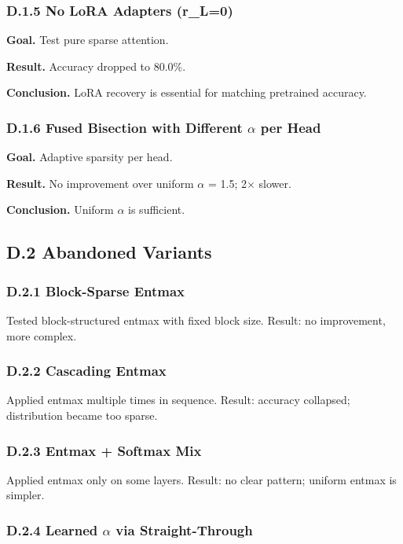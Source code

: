 \subsubsection{D.1.5 No LoRA Adapters (r\_L=0)}

\textbf{Goal.} Test pure sparse attention.

\textbf{Result.} Accuracy dropped to 80.0\%.

\textbf{Conclusion.} LoRA recovery is essential for matching pretrained accuracy.

\subsubsection{D.1.6 Fused Bisection with Different $\alpha$ per Head}

\textbf{Goal.} Adaptive sparsity per head.

\textbf{Result.} No improvement over uniform $\alpha$ = 1.5; 2$\times$ slower.

\textbf{Conclusion.} Uniform $\alpha$ is sufficient.

\subsection{D.2 Abandoned Variants}

\subsubsection{D.2.1 Block-Sparse Entmax}

Tested block-structured entmax with fixed block size. Result: no improvement, 
more complex.

\subsubsection{D.2.2 Cascading Entmax}

Applied entmax multiple times in sequence. Result: accuracy collapsed; 
distribution became too sparse.

\subsubsection{D.2.3 Entmax + Softmax Mix}

Applied entmax only on some layers. Result: no clear pattern; uniform 
entmax is simpler.

\subsubsection{D.2.4 Learned $\alpha$ via Straight-Through}

